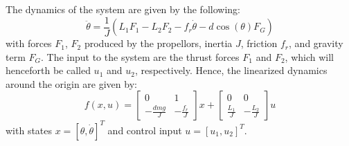 
The dynamics of the system are given by the following:
\begin{equation}
    \ddot\theta = \frac{1}{J}(L_1F_1-L_2F_2-f_r\dot\theta-d\cos(\theta)F_{G})
    \label{eq:dyn-double-flying-arm}
\end{equation}
with forces $F_1$, $F_2$ produced by the propellors, inertia $J$, friction $f_r$, and gravity term $F_{G}$. The input to the system are the thrust forces $F_1$ and $F_2$, which will henceforth be called $u_1$ and $u_2$, respectively. Hence, the linearized dynamics around the origin are given by:
\begin{equation}
    f(x,u) =
    \begin{bmatrix}
        0 & 1 \\
        -\frac{dmg}{J} & -\frac{f_r}{J}
    \end{bmatrix}
    x
    +
    \begin{bmatrix}
        0 & 0 \\
        \frac{L_1}{J} & -\frac{L_2}{J}
    \end{bmatrix}
    u
    \label{eq:sys-linearized}
\end{equation}
with states $x=[\theta, \dot\theta]^T$ and control input $u=[u_1, u_2]^T$.